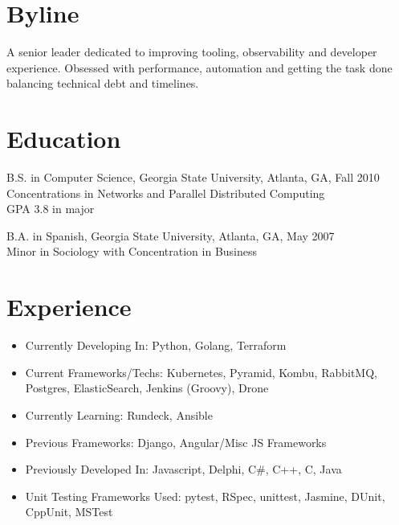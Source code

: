 \documentclass[margin]{res}
\begin{document}

\address{217 Rockyford Rd NE \\ Atlanta, GA 30317 \\
        (678) 773-1545 }

\begin{resume}

\section{Byline}
    A senior leader dedicated to improving tooling, observability and developer experience. Obsessed with
    performance, automation and getting the task done balancing technical debt and timelines.

\section{Education}
    B.S. in Computer Science, Georgia State University, Atlanta, GA, Fall 2010  \\
    Concentrations in Networks and Parallel Distributed Computing \\
    GPA 3.8 in major

    B.A. in Spanish, Georgia State University, Atlanta, GA, May 2007 \\
    Minor in Sociology with Concentration in Business


\section{Experience}
    \begin{itemize} \itemsep -2pt  %
        \item Currently Developing In: Python, Golang, Terraform
        \item Current Frameworks/Techs: Kubernetes, Pyramid, Kombu, RabbitMQ, Postgres, ElasticSearch, Jenkins
            (Groovy), Drone
        \item Currently Learning: Rundeck, Ansible
        \item Previous Frameworks: Django, Angular/Misc JS Frameworks
        \item Previously Developed In: Javascript, Delphi, C\#, C++, C, Java
        \item Unit Testing Frameworks Used: pytest, RSpec, unittest, Jasmine, DUnit, CppUnit, MSTest
    \end{itemize}


\end{resume}
\end{document}
